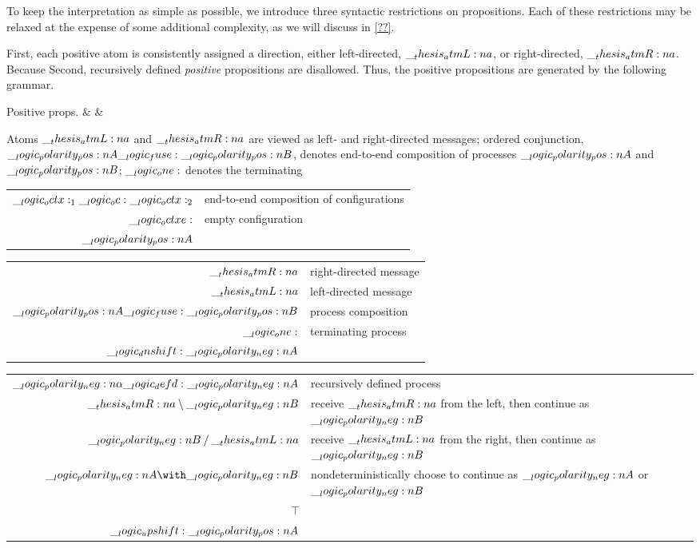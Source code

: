 To keep the interpretation as simple as possible, we introduce three syntactic restrictions on propositions.
Each of these restrictions may be relaxed at the expense of some additional complexity, as we will discuss in \cref{??}.

First, each positive atom is consistently assigned a direction, either left-directed, $\__thesis_atmL:n {a}$, or right-directed, $\__thesis_atmR:n {a}$.
Because 
Second, recursively defined \emph{positive} propositions are disallowed.
Thus, the positive propositions are generated by the following grammar.
\begin{syntax*}
  Positive props. &
     &  \mid {} \mid {} \fuse {} \mid \one \mid \dn {}
\end{syntax*}
Atoms $\__thesis_atmL:n {a}$ and $\__thesis_atmR:n {a}$ are viewed as left- and right-directed messages; ordered conjunction, $\__logic_polarity_pos:n {A} \__logic_fuse: \__logic_polarity_pos:n {B}$, denotes end-to-end composition of processes $\__logic_polarity_pos:n {A}$ and $\__logic_polarity_pos:n {B}$; $\__logic_one:$ denotes the terminating 

\begin{tabular}{@{}rl@{}}
  $\__logic_octx:_1 \__logic_oc: \__logic_octx:_2$ & end-to-end composition of configurations \\
  $\__logic_octxe:$ & empty configuration \\
  $\__logic_polarity_pos:n {A}$ & 
\end{tabular}

\begin{tabular}{@{}rl@{}}
  $\__thesis_atmR:n {a}$ & right-directed message \\
  $\__thesis_atmL:n {a}$ & left-directed message \\
  $\__logic_polarity_pos:n {A} \__logic_fuse: \__logic_polarity_pos:n {B}$ & process composition \\
  $\__logic_one:$ & terminating process \\
  $\__logic_dnshift: \__logic_polarity_neg:n {A}$ & 
\end{tabular}

\begin{tabular}{@{}rl@{}}
  $\__logic_polarity_neg:n {\alpha} \__logic_defd: \__logic_polarity_neg:n {A}$ & recursively defined process \\
  $\__thesis_atmR:n {a} \mathbin { \setminus } \__logic_polarity_neg:n {B}$ & receive $\__thesis_atmR:n {a}$ from the left, then continue as $\__logic_polarity_neg:n {B}$ \\
  $\__logic_polarity_neg:n {B} \mathbin { / } \__thesis_atmL:n {a}$ & receive $\__thesis_atmL:n {a}$ from the right, then continue as $\__logic_polarity_neg:n {B}$ \\
  $\n{A} \with \n{B}$ & nondeterministically choose to continue as $\__logic_polarity_neg:n {A}$ or $\__logic_polarity_neg:n {B}$ \\
  $\top$ & \\
  $\__logic_upshift: \__logic_polarity_pos:n {A}$ &
\end{tabular}

